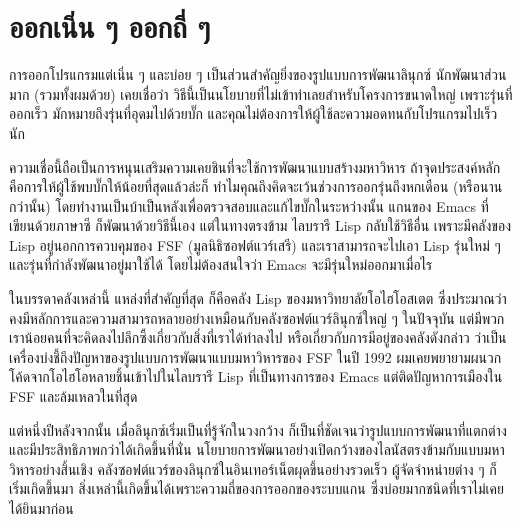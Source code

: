 \chapter{ออกเนิ่น ๆ ออกถี่ ๆ }

การออกโปรแกรมแต่เนิ่น  ๆ   และบ่อย  ๆ
เป็นส่วนสำคัญยิ่งของรูปแบบการพัฒนาลินุกซ์ นักพัฒนาส่วนมาก
(รวมทั้งผมด้วย) เคยเชื่อว่า
วิธีนี้เป็นนโยบายที่ไม่เข้าท่าเลยสำหรับโครงการขนาดใหญ่
เพราะรุ่นที่ออกเร็ว มักหมายถึงรุ่นที่อุดมไปด้วยบั๊ก
และคุณไม่ต้องการให้ผู้ใช้ละความอดทนกับโปรแกรมไปเร็วนัก

ความเชื่อนี้ถือเป็นการหนุนเสริมความเคยชินที่จะใช้การพัฒนาแบบสร้างมหาวิหาร
ถ้าจุดประสงค์หลักคือการให้ผู้ใช้พบบั๊กให้น้อยที่สุดแล้วล่ะก็
ทำไมคุณถึงคิดจะเว้นช่วงการออกรุ่นถึงหกเดือน (หรือนานกว่านั้น)
โดยทำงานเป็นบ้าเป็นหลังเพื่อตรวจสอบและแก้ไขบั๊กในระหว่างนั้น แกนของ
Emacs ที่เขียนด้วยภาษาซี ก็พัฒนาด้วยวิธีนี้เอง แต่ในทางตรงข้าม ไลบรารี
Lisp กลับใช้วิธีอื่น เพราะมีคลังของ Lisp อยู่นอกการควบคุมของ FSF
(มูลนิธิซอฟต์แวร์เสรี) และเราสามารถจะไปเอา Lisp รุ่นใหม่  ๆ
และรุ่นที่กำลังพัฒนาอยู่มาใช้ได้ โดยไม่ต้องสนใจว่า Emacs
จะมีรุ่นใหม่ออกมาเมื่อไร 

ในบรรดาคลังเหล่านี้ แหล่งที่สำคัญที่สุด ก็คือคลัง Lisp
ของมหาวิทยาลัยโอไฮโอสเตต
ซึ่งประมาณว่าคงมีหลักการและความสามารถหลายอย่างเหมือนกับคลังซอฟต์แวร์ลินุกซ์ใหญ่  ๆ
ในปัจจุบัน
แต่มีพวกเราน้อยคนที่จะคิดลงไปลึกซึ้งเกี่ยวกับสิ่งที่เราได้ทำลงไป
หรือเกี่ยวกับการมีอยู่ของคลังดังกล่าว
ว่าเป็นเครื่องบ่งชี้ถึงปัญหาของรูปแบบการพัฒนาแบบมหาวิหารของ FSF ในปี
1992 ผมเคยพยายามผนวกโค้ดจากโอไฮโอหลายชิ้นเข้าไปในไลบรารี Lisp
ที่เป็นทางการของ Emacs แต่ติดปัญหาการเมืองใน FSF และล้มเหลวในที่สุด

แต่หนึ่งปีหลังจากนั้น เมื่อลินุกซ์เริ่มเป็นที่รู้จักในวงกว้าง
ก็เป็นที่ชัดเจนว่ารูปแบบการพัฒนาที่แตกต่างและมีประสิทธิภาพกว่าได้เกิดขึ้นที่นั่น
นโยบายการพัฒนาอย่างเปิดกว้างของไลนัสตรงข้ามกับแบบมหาวิหารอย่างสิ้นเชิง
คลังซอฟต์แวร์ของลินุกซ์ในอินเทอร์เน็ตผุดขึ้นอย่างรวดเร็ว
ผู้จัดจำหน่ายต่าง  ๆ   ก็เริ่มเกิดขึ้นมา
สิ่งเหล่านี้เกิดขึ้นได้เพราะความถี่ของการออกของระบบแกน
ซึ่งบ่อยมากชนิดที่เราไม่เคยได้ยินมาก่อน

